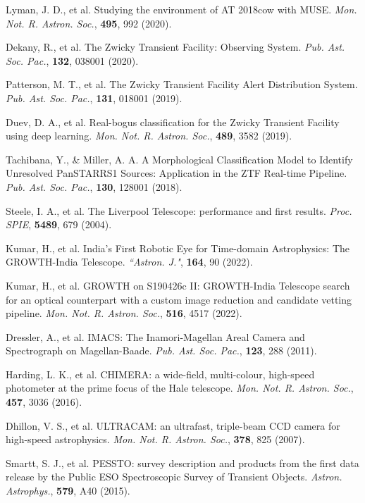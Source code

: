 \documentclass{nature_plusfigure}
\newcommand{\mn}{{Mon. Not. R. Astron. Soc.}}
\newcommand{\mnras}{\mn}
\newcommand{\aj}{{``Astron. J."}}
\newcommand{\aap}{{Astron. Astrophys.}}
\newcommand{\pasp}{{Pub. Ast. Soc. Pac.}}
\newcommand{\procspie}{Proc. SPIE}
\begin{document}
\begin{methods}
\begin{thebibliography}{10}
 
  Lyman, J. D., et al. Studying the environment of AT 2018cow with MUSE. \emph{\mnras}, \textbf{495}, 992 (2020). 



 Dekany, R., et al. The Zwicky Transient Facility: Observing System. \emph{\pasp}, \textbf{132}, 038001 (2020). 

 Patterson, M. T., et al. The Zwicky Transient Facility Alert Distribution System. \emph{\pasp}, \textbf{131}, 018001 (2019). 

  Duev, D. A., et al. Real-bogus classification for the Zwicky Transient Facility using deep learning. \emph{\mnras}, \textbf{489}, 3582 (2019). 

 Tachibana, Y., \& Miller, A. A. A Morphological Classification Model to Identify Unresolved PanSTARRS1 Sources: Application in the ZTF Real-time Pipeline. \emph{\pasp}, \textbf{130}, 128001 (2018). 

 Steele, I. A., et al. The Liverpool Telescope: performance and first results. \emph{\procspie}, \textbf{5489}, 679 (2004). 

 Kumar, H., et al. India's First Robotic Eye for Time-domain Astrophysics: The GROWTH-India Telescope. \emph{\aj}, \textbf{164}, 90 (2022). 

 Kumar, H., et al. GROWTH on S190426c II: GROWTH-India Telescope search for an optical counterpart with a custom image reduction and candidate vetting pipeline. \emph{\mnras}, \textbf{516}, 4517 (2022). 

 Dressler, A., et al. IMACS: The Inamori-Magellan Areal Camera and Spectrograph on Magellan-Baade. \emph{\pasp}, \textbf{123}, 288 (2011). 

 Harding, L. K., et al. CHIMERA: a wide-field, multi-colour, high-speed photometer at the prime focus of the Hale telescope. \emph{\mnras}, \textbf{457}, 3036 (2016). 

 Dhillon, V. S., et al. ULTRACAM: an ultrafast, triple-beam CCD camera for high-speed astrophysics. \emph{\mnras}, \textbf{378}, 825 (2007). 

  Smartt, S. J., et al. PESSTO: survey description and products from the first data release by the Public ESO Spectroscopic Survey of Transient Objects. \emph{\aap}, \textbf{579}, A40 (2015). 


\end{thebibliography}
\end{methods}
\end{document}
